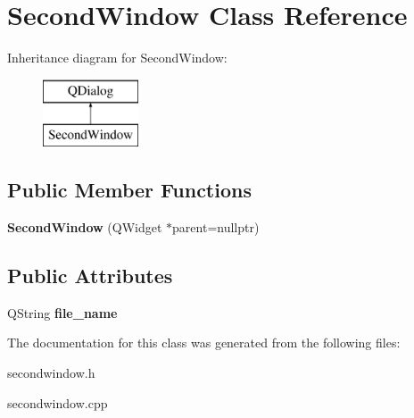 \hypertarget{class_second_window}{}\section{Second\+Window Class Reference}
\label{class_second_window}
Inheritance diagram for Second\+Window\+:\begin{figure}[H]
\begin{center}
\leavevmode
\includegraphics[height=2.000000cm]{class_second_window}
\end{center}
\end{figure}
\subsection*{Public Member Functions}
\begin{DoxyCompactItemize}
\item 
\mbox{\label{class_second_window_ad106a380e805c5818eff68c037e88a99}} 
{\bfseries Second\+Window} (Q\+Widget $\ast$parent=nullptr)
\end{DoxyCompactItemize}
\subsection*{Public Attributes}
\begin{DoxyCompactItemize}
\item 
\mbox{\label{class_second_window_adb84c4c890fe7bf0acf413a4b66fe48e}} 
Q\+String {\bfseries file\+\_\+name}
\end{DoxyCompactItemize}


The documentation for this class was generated from the following files\+:\begin{DoxyCompactItemize}
\item 
secondwindow.\+h\item 
secondwindow.\+cpp\end{DoxyCompactItemize}
